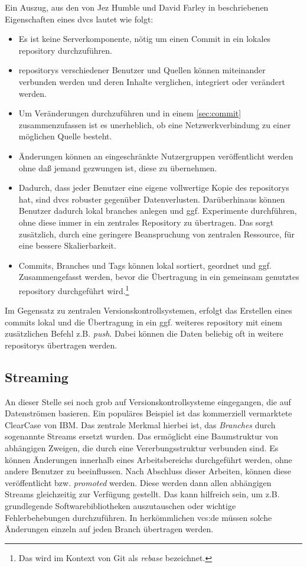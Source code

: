 Ein Auszug, aus den von Jez Humble und David Farley in \cite[S.~393-394]{cd}
beschriebenen Eigenschaften eines \acrshort{dvcs} lautet wie folgt:

\begin{itemize}
\item Es ist keine Serverkomponente, nötig um einen Commit in ein lokales
\gls{repository} durchzuführen.
\item \glspl{repository} verschiedener Benutzer und Quellen können miteinander
verbunden werden und deren Inhalte verglichen, integriert oder verändert werden.
\item Um Veränderungen durchzuführen und in einem \ref{sec:commit} zusammenzufassen
ist es unerheblich, ob eine Netzwerkverbindung zu einer möglichen Quelle besteht.
\item Änderungen können an eingeschränkte Nutzergruppen veröffentlicht werden
ohne daß jemand gezwungen ist, diese zu übernehmen.
\item Dadurch, dass jeder Benutzer eine eigene vollwertige Kopie des
\glspl{repository} hat, sind \acrshort{dvcs} robuster gegenüber Datenverlusten.
Darüberhinaus können Benutzer dadurch lokal branches anlegen und ggf.
Experimente durchführen, ohne diese immer in ein zentrales Repository zu
übertragen.  Das sorgt zusätzlich, durch eine geringere Beanspruchung von
zentralen Ressource, für eine bessere Skalierbarkeit.
\item Commits, Branches und Tags können lokal sortiert, geordnet und ggf.
Zusammengefasst werden, bevor die Übertragung in ein gemeinsam genutztes
\gls{repository} durchgeführt wird.\footnote{Das wird im Kontext von Git als
\textit{rebase} bezeichnet.}
\end{itemize}

Im Gegensatz zu zentralen Versionskontrollsystemen, erfolgt das Erstellen eines
\glspl{commit} lokal und die Übertragung in ein ggf. weiteres \gls{repository}
mit einem zusätzlichen Befehl z.B. \textit{push}. Dabei können die Daten beliebig
oft in weitere \glspl{repository} übertragen werden.

\subsection{Streaming}\label{sec:streaming}
An dieser Stelle sei noch grob auf Versionskontrollsysteme eingegangen, die auf
Datenströmen basieren. Ein populäres Beispiel ist das kommerziell vermarktete
ClearCase von IBM. Das zentrale Merkmal hierbei ist, das \textit{Branches}
durch sogenannte Streams ersetzt wurden. Das ermöglicht eine Baumstruktur von
abhängigen Zweigen, die durch eine Vererbungsstruktur verbunden sind. Es können
Änderungen innerhalb eines Arbeitsbereichs durchgeführt werden, ohne andere
Benutzer zu beeinflussen. Nach Abschluss dieser Arbeiten, können diese
veröffentlicht bzw.  \textit{promoted} werden. Diese werden dann allen
abhängigen Streams gleichzeitig zur Verfügung gestellt. Das kann hilfreich
sein, um z.B.  grundlegende Softwarebibliotheken auszutauschen oder wichtige
Fehlerbehebungen durchzuführen. In herkömmlichen \acrshort{vcs:de} müssen
solche Änderungen einzeln auf jeden Branch übertragen werden.
